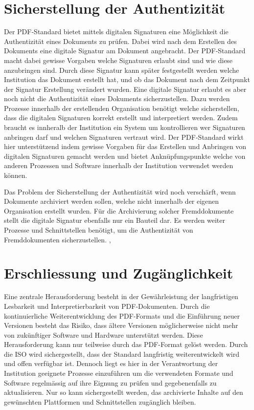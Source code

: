 \documentclass[a4paper,oneside, 12pt]{report}
\begin{document}
\section{Sicherstellung der Authentizität}
Der PDF-Standard bietet mittels digitalen Signaturen eine Möglichkeit die Authentizität eines Dokuments zu prüfen. Dabei wird nach dem Erstellen des Dokuments eine digitale Signatur am Dokument angebracht. Der PDF-Standard macht dabei gewisse Vorgaben welche Signaturen erlaubt sind und wie diese anzubringen sind. Durch diese Signatur kann später festgestellt werden welche Institution das Dokument erstellt hat, und ob das Dokument nach dem Zeitpunkt der Signatur Erstellung verändert wurden. Eine digitale Signatur erlaubt es aber noch nicht die Authentizität eines Dokuments sicherzustellen. Dazu werden Prozesse innerhalb der erstellenden Organisation benötigt welche sicherstellen, dass die digitalen Signaturen korrekt erstellt und interpretiert werden. Zudem braucht es innheralb der Institution ein System um kontrollieren wer Signaturen anbringen darf und welchen Signaturen vertraut wird. Der PDF-Standard wirkt hier unterstützend indem gewisse Vorgaben für das Erstellen und Anbringen von digitalen Signaturen gemacht werden und bietet Anknüpfungspunkte welche von anderen Prozessen und Software innerhalb der Institution verwendet werden können.

Das Problem der Sicherstellung der Authentizität wird noch verschärft, wenn Dokumente archiviert werden sollen, welche nicht innerhalb der eigenen Organisation erstellt wurden. Für die Archivierung solcher Fremddokumente stellt die digitale Signatur ebenfalls nur ein Bauteil dar. Es werden weiter Prozesse und Schnittstellen benötigt, um die Authentizität von Fremddokumenten sicherzustellen. \cite{pdftools}, \cite{pdfanutshell}



\section{Erschliessung und Zugänglichkeit}
 Eine zentrale Herausforderung besteht in der Gewährleistung der langfristigen Lesbarkeit und Interpretierbarkeit von \ac{PDF}-Dokumenten. Durch die kontinuierliche Weiterentwicklung des \ac{PDF}-Formats und die Einführung neuer Versionen besteht das Risiko, dass ältere Versionen möglicherweise nicht mehr von zukünftiger Software und Hardware unterstützt werden. Diese Herausforderung kann nur teilweise durch das PDF-Format gelöst werden. Durch die \ac{ISO} wird sichergestellt, dass der Standard langfristig weiterentwickelt wird und offen verfügbar ist. Dennoch liegt es hier in der Verantwortung der Institution geeignete Prozesse einzuführen um die verwendeten Formate und Software regelmässig auf ihre Eignung zu prüfen und gegebenenfalls zu aktualisieren. Nur so kann sichergestellt werden, das archivierte Inhalte auf den gewünschten Plattformen und Schnittstellen zugänglich bleiben. 
\end{document}
